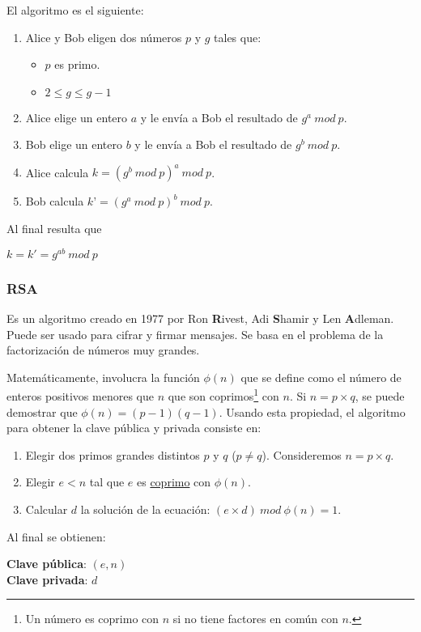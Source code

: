 El algoritmo es el siguiente:
\begin{enumerate}
	\item Alice y Bob eligen dos números $p$ y $g$ tales que:
	\begin{itemize}
		\item $p$ es primo.
		\item $2\leq g\leq g-1$ 
	\end{itemize}
	\item Alice elige un entero $a$ y le envía a Bob el resultado de $g^a\ mod\ p$.
	\item Bob elige un entero $b$ y le envía a Bob el resultado de $g^b\ mod\ p$.
	\item Alice calcula $k = (g^b\ mod\ p)^a\ mod\ p$.
	\item Bob calcula $k’ = (g^a\ mod\ p)^b\ mod\ p$.
\end{enumerate}

Al final resulta que
\begin{center}
	\large{$\displaystyle k = k' = g^{ab}\ mod\ p$}
\end{center}

\subsubsection{RSA}
Es un algoritmo creado en 1977 por Ron \textbf{\large{R}}ivest, Adi \textbf{\large{S}}hamir y Len \textbf{\large{A}}dleman. Puede ser usado para cifrar y firmar mensajes. Se basa en el problema de la factorización de números muy grandes.

Matemáticamente, involucra la función $\phi(n)$ que se define como el número de enteros positivos menores que $n$ que son coprimos\footnote{Un número es coprimo con $n$ si no tiene factores en común con $n$.} con $n$. Si $n=p\times q$, se puede demostrar que $\phi(n) = (p-1)(q-1)$. Usando esta propiedad, el algoritmo para obtener la clave pública y privada consiste en:
\begin{enumerate}
 	\item Elegir dos primos grandes distintos $p$ y $q$ ($p\neq q$). Consideremos $n = p\times q$.
 	\item Elegir $e < n$ tal que $e$ es \underline{coprimo} con $\phi(n)$.
 	\item Calcular $d$ la solución de la ecuación: $(e\times d)\ mod\ \phi(n) = 1$.
 \end{enumerate} 

Al final se obtienen:
\begin{center}
	\textbf{Clave pública}: $(e, n)$\\
	\textbf{Clave privada}: $d$
\end{center}


